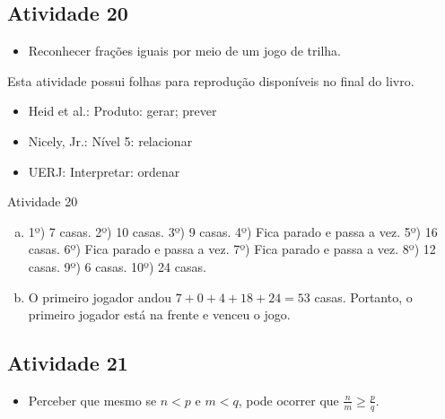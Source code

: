 %

\subsection{Atividade 20}

\begin{itemize} %
    \item       Reconhecer frações iguais por meio de um jogo de trilha.
\end{itemize} %


  Esta atividade possui folhas para reprodução disponíveis no final do
livro.

   \vspace{.1cm}

 \vspace{.1cm}

\begin{itemize} %
    \item       Heid et al.: Produto: gerar; prever
    \item       Nicely, Jr.: Nível 5: relacionar
    \item       UERJ: Interpretar: ordenar
\end{itemize} %

\newpage
\begin{resposta*}{Atividade 20}
\begin{enumerate}[a)]
\item 1º) 7 casas. 2º) 10 casas. 3º) 9 casas. 4º) Fica parado e passa a vez. 5º) 16 casas. 6º) Fica parado e passa a vez. 7º) Fica parado e passa a vez. 8º) 12 casas. 9º) 6 casas.
10º) 24 casas.

\item O primeiro jogador andou $7 + 0 + 4 + 18 + 24 = 53$ casas. Portanto, o primeiro jogador está na frente e venceu o jogo.
\end{enumerate}
\end{resposta*}


\subsection{Atividade 21}

\begin{itemize} %
    \item       Perceber que mesmo se       $n < p$       e       $m < q$, pode
ocorrer que       $\frac{n}{m} \geq \frac{p}{q}$.
\end{itemize} %


